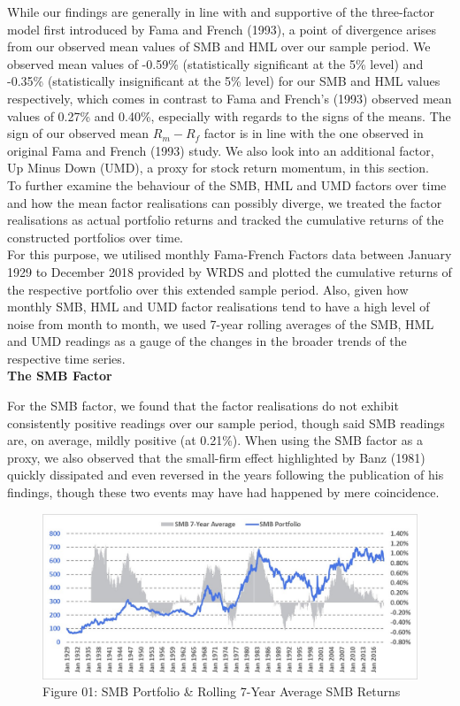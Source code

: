 \documentclass[12pt]{article}
\begin{document}
\noindent While our findings are generally in line with and supportive of the three-factor model first introduced by Fama and French (1993), a point of divergence arises from our observed mean values of SMB and HML over our sample period. We observed mean values of -0.59\% (statistically significant at the 5\% level) and -0.35\% (statistically insignificant at the 5\% level) for our SMB and HML values respectively, which comes in contrast to Fama and French's (1993) observed mean values of 0.27\% and 0.40\%, especially with regards to the signs of the means. The sign of our observed mean $R_m - R_f$ factor is in line with the one observed in original Fama and French (1993) study. We also look into an additional factor, Up Minus Down (UMD), a proxy for stock return momentum, in this section.\\

\noindent To further examine the behaviour of the SMB, HML and UMD factors over time and how the mean factor realisations can possibly diverge, we treated the factor realisations as actual portfolio returns and tracked the cumulative returns of the constructed portfolios over time. \\

\noindent For this purpose, we utilised monthly Fama-French Factors data between January 1929 to December 2018 provided by WRDS and plotted the cumulative returns of the respective portfolio over this extended sample period. Also, given how monthly SMB, HML and UMD factor realisations tend to have a high level of noise from month to month, we used 7-year rolling averages of the SMB, HML and UMD readings as a gauge of the changes in the broader trends of the respective time series.\\

\noindent \textbf{The SMB Factor}

\noindent For the SMB factor, we found that the factor realisations do not exhibit consistently positive readings over our sample period, though said SMB readings are, on average, mildly positive (at 0.21\%). When using the SMB factor as a proxy, we also observed that the small-firm effect highlighted by Banz (1981) quickly dissipated and even reversed in the years following the publication of his findings, though these two events may have had happened by mere coincidence.

\begin{figure}[h]
	\centering
	\includegraphics[width=0.9\linewidth]{SMB01}
	\caption*{Figure 01: SMB Portfolio \& Rolling 7-Year Average SMB Returns}
	\label{fig:label}
\end{figure}
\end{document}
